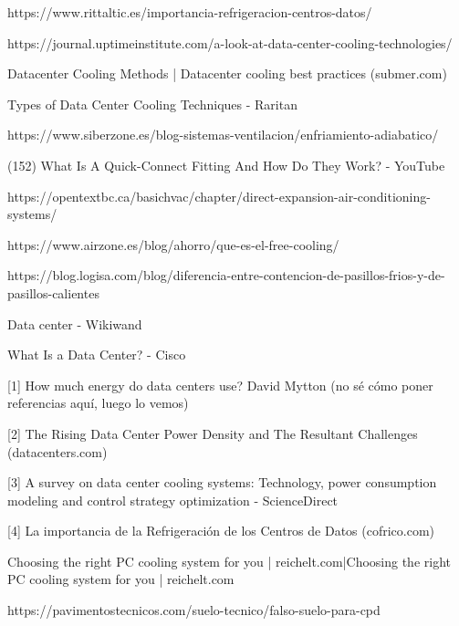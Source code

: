 https://www.rittaltic.es/importancia-refrigeracion-centros-datos/

https://journal.uptimeinstitute.com/a-look-at-data-center-cooling-technologies/

Datacenter Cooling Methods | Datacenter cooling best practices (submer.com)

Types of Data Center Cooling Techniques - Raritan

https://www.siberzone.es/blog-sistemas-ventilacion/enfriamiento-adiabatico/

(152) What Is A Quick-Connect Fitting And How Do They Work? - YouTube

https://opentextbc.ca/basichvac/chapter/direct-expansion-air-conditioning-systems/

https://www.airzone.es/blog/ahorro/que-es-el-free-cooling/

https://blog.logisa.com/blog/diferencia-entre-contencion-de-pasillos-frios-y-de-pasillos-calientes

Data center - Wikiwand

What Is a Data Center? - Cisco

[1] How much energy do data centers use? David Mytton (no sé cómo poner referencias aquí, luego lo vemos)

[2] The Rising Data Center Power Density and The Resultant Challenges (datacenters.com)

[3] A survey on data center cooling systems: Technology, power consumption modeling and control strategy optimization - ScienceDirect

[4] La importancia de la Refrigeración de los Centros de Datos (cofrico.com)

Choosing the right PC cooling system for you | reichelt.com|Choosing the right PC cooling system for you | reichelt.com

https://pavimentostecnicos.com/suelo-tecnico/falso-suelo-para-cpd
